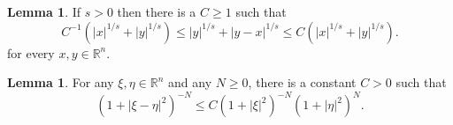 \documentclass[11pt,a4paper,reqno]{amsart}
\numberwithin{equation}{section}
\theoremstyle{definition}
\newtheorem{lemma}[thm]{Lemma}
\theoremstyle{definition}
\begin{document}
\begin{lemma}\label{lem:absolutineq}
If $s>0$ then there is a $C \geq 1$ such that
\begin{equation}\label{eq:absolutineq}
    C^{-1} (|x|^{1/s} + |y|^{1/s} ) \leq |y|^{1/s} + |y-x|^{1/s} \leq C (|x|^{1/s} + |y|^{1/s} ).
\end{equation}
for every $x,y\in\mathbb{R}^n$.
\end{lemma}
\begin{lemma}\label{lem:absolutineq3}
For any $\xi,\eta\in \mathbb{R}^n$ and any $N\geq 0$, there is a constant $C>0$ such that
\begin{equation*}
    (1+|\xi-\eta|^2)^{-N} \leq C (1+|\xi|^2)^{-N} (1+|\eta|^2)^N.
\end{equation*}
\end{lemma}
\end{document}
